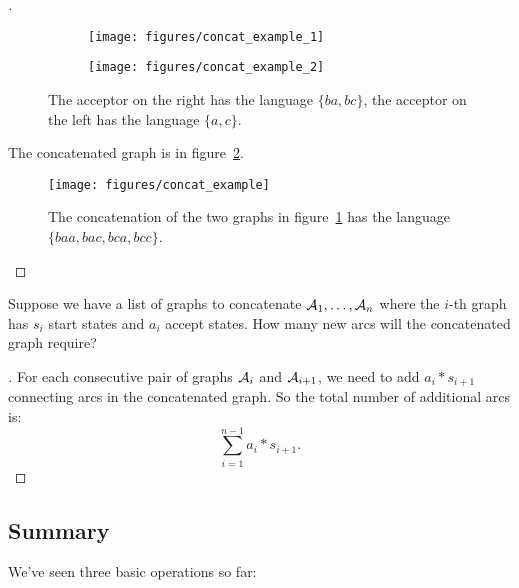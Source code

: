\begin{proof}[\unskip\nopunct]

\begin{figure}
    \centering
    \begin{subfigure}[b]{0.48\textwidth}
        \centering
        \texttt{[image: figures/concat\_example\_1]}
    \end{subfigure}
    \begin{subfigure}[b]{0.48\textwidth}
        \centering
        \texttt{[image: figures/concat\_example\_2]}
    \end{subfigure}
    \caption{The acceptor on the right has the language $\{ba, bc\}$, the
    acceptor on the left has the language $\{a, c\}$.}
    \label{fig:concat_example_inputs}
\end{figure}

The concatenated graph is in figure~\ref{fig:concat_example}.

\begin{figure}
    \centering
    \texttt{[image: figures/concat\_example]}
    \caption{The concatenation of the two graphs in
    figure~\ref{fig:concat_example_inputs} has the language $\{baa, bac, bca,
    bcc\}$.}
    \label{fig:concat_example}
\end{figure}

\end{proof}

\begin{example}
Suppose we have a list of graphs to concatenate $\mathcal{A}_1, \ldots, \mathcal{A}_n$ where the
$i$-th graph has $s_i$ start states and $a_i$ accept states. How many new
arcs will the concatenated graph require?
\end{example}

\begin{proof}[\unskip\nopunct]
For each consecutive pair of graphs $\mathcal{A}_i$ and $\mathcal{A}_{i+1}$, we need to add
$a_i * s_{i+1}$ connecting arcs in the concatenated graph. So the total
number of additional arcs is:
$$
\sum_{i=1}^{n-1} a_i * s_{i+1}.
$$
\end{proof}

\subsection{Summary}

We've seen three basic operations so far:

